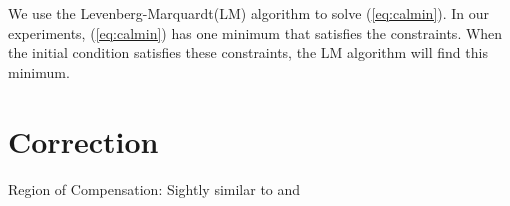 \documentclass{svjour3}                     %
\begin{document}
We use the Levenberg-Marquardt(LM) \cite{fletcher1971modified} algorithm to solve (\ref{eq:calmin}). In our experiments, (\ref{eq:calmin}) has one minimum that satisfies the constraints. When the initial condition satisfies these constraints, the LM algorithm will find this minimum.


\section{Correction}
\label{sec:cor}
Region of Compensation: Sightly similar to \cite{tian2018accuracy} and \cite{pan2013high}
\end{document}
